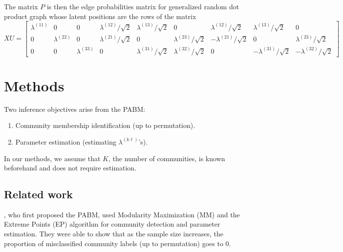 \documentclass[12pt]{article}
\providecommand{\tightlist}{%
  \setlength{\itemsep}{0pt}\setlength{\parskip}{0pt}}
\begin{document}
\begin{example}
The matrix $P$ is then the edge probabilities matrix for generalized random dot product
graph whose latent positions are the rows of the matrix
$$XU = \begin{bmatrix}
  \lambda^{(11)} & 0 & 0 &
  \lambda^{(12)} / \sqrt{2} & \lambda^{(13)} / \sqrt{2} & 0 &
  \lambda^{(12)} / \sqrt{2} & \lambda^{(13)} / \sqrt{2} & 0 \\
  0 & \lambda^{(22)} & 0 &
  \lambda^{(21)} / \sqrt{2} & 0 & \lambda^{(23)} / \sqrt{2} &
  -\lambda^{(21)} / \sqrt{2} & 0 & \lambda^{(23)} / \sqrt{2} \\
  0 & 0 & \lambda^{(33)} &
  0 & \lambda^{(31)} / \sqrt{2} & \lambda^{(32)} / \sqrt{2} &
  0 & -\lambda^{(31)} / \sqrt{2} & -\lambda^{(32)} / \sqrt{2}
\end{bmatrix}$$
\end{example}

\hypertarget{methods}{%
\section{Methods}\label{methods}}

Two inference objectives arise from the PABM:

\begin{enumerate}
\def\labelenumi{\arabic{enumi}.}
\tightlist
\item
  Community membership identification (up to permutation).
\item
  Parameter estimation (estimating \(\lambda^{(k \ell)}\)'s).
\end{enumerate}

In our methods, we assume that \(K\), the number of communities, is
known beforehand and does not require estimation.

\hypertarget{related-work}{%
\subsection{Related work}\label{related-work}}

\citet{307cbeb9b1be48299388437423d94bf1}, who first proposed the
PABM, used Modularity Maximization (MM) and the Extreme Points (EP)
algorithm \cite{le2016} for community detection and parameter
estimation. They were able to show that as the sample size increases,
the proportion of misclassified community labels (up to permutation)
goes to 0.
\end{document}
